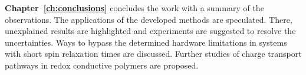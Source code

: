 \par
\textbf{Chapter~\ref{ch:conclusions}} concludes the work with a summary of the observations. The applications of the developed methods are speculated. There, unexplained results are highlighted and experiments are suggested to resolve the uncertainties. Ways to bypass the determined hardware limitations in systems with short spin relaxation times are discussed. Further studies of charge transport pathways in redox conductive polymers are proposed.
